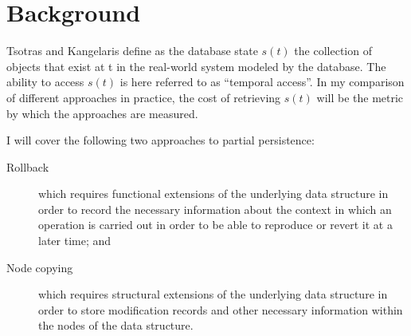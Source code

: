 \chapter{Background}

Tsotras and Kangelaris \cite{Tsotras1995237} define as the database state $s(t)$
the collection of objects that exist at t in the real-world system modeled by
the database. The ability to access $s(t)$ is here referred to as ``temporal
access''. In my comparison of different approaches in practice, the cost of
retrieving $s(t)$ will be the metric by which the approaches are measured.

I will cover the following two approaches to partial persistence:
\begin{description}
  \item[Rollback] which requires functional extensions of the underlying data
  structure in order to record the necessary information about the context in
  which an operation is carried out in order to be able to reproduce or revert
  it at a later time; and
  \item[Node copying] which requires structural extensions of the underlying
  data structure in order to store modification records and other necessary
  information within the nodes of the data structure.
\end{description}
